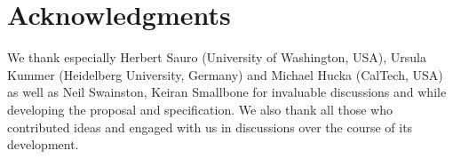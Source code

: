 
\section{Acknowledgments}

We thank especially Herbert Sauro (University of Washington, USA), Ursula Kummer (Heidelberg University, Germany) and Michael Hucka (CalTech, USA) as well as Neil Swainston, Keiran Smallbone for invaluable discussions and while developing the \FBCPackage proposal and specification.  We also thank all those who contributed ideas and engaged with us in discussions over the course of its development.


